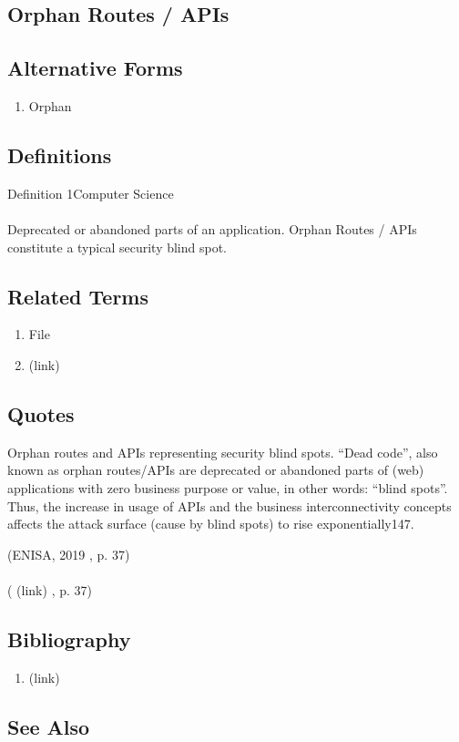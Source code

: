 \newpage \subsection*{Orphan Routes / APIs } \subsection*{Alternative Forms } \begin{enumerate} \item  Orphan  \end{enumerate} \subsection*{Definitions } \begin{DIC_Def}{Definition 1Computer Science }{} \paragraph{} Deprecated or abandoned parts of an application. Orphan Routes / APIs constitute a typical security blind spot.  \end{DIC_Def} \subsection*{Related Terms } \begin{enumerate} \item  File  \item  (link) \href{Orphan (Dictionary Entry) }{ }   \end{enumerate} \subsection*{Quotes } \begin{DIC_BlockQuote} Orphan routes and APIs representing security blind spots. ``Dead code'', also known as orphan routes/APIs are deprecated or abandoned parts of (web) applications with zero business purpose or value, in other words: ``blind spots''. Thus, the increase in usage of APIs and the business interconnectivity concepts affects the attack surface (cause by blind spots) to rise exponentially147.  \end{DIC_BlockQuote} (ENISA, 2019 , p. 37)  \paragraph{} (  (link) \href{ENISA, 2019 }{ } , p. 37)  \subsection*{Bibliography } \begin{enumerate} \item  (link) \href{ENISA, 2019 }{ }   \end{enumerate} \subsection*{See Also } 